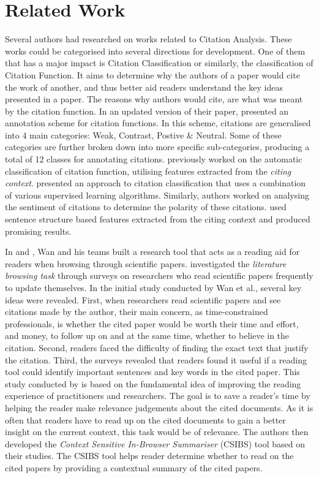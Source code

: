 \chapter{Related Work}
\label{Related Works}

Several authors had researched on works related to Citation Analysis. These works could be categorised into several directions for development. One of them that has a major impact is Citation Classification or similarly, the classification of Citation Function. It aims to determine why the authors of a paper would cite the work of another, and thus better aid readers understand the key ideas presented in a paper. The reasons why authors would cite, are what was meant by the citation function. In an updated version of their paper,  presented an annotation scheme for citation functions. In this scheme, citations are generalised into 4 main categories: Weak, Contrast, Postive \& Neutral. Some of these categories are further broken down into more specific sub-categories, producing a total of 12 classes for annotating citations.  previously worked on the automatic classification of citation function, utilising features extracted from the \textit{citing context}.  presented an approach to citation classification that uses a combination of various supervised learning algorithms. Similarly, authors worked on analysing the sentiment of citations to determine the polarity of these citations.  used sentence structure based features extracted from the citing context and produced promising results.

In \cite{citation-sensitive} and \cite{csibs}, Wan and his teams built a research tool that acts as a reading aid for readers when browsing through scientific papers.  investigated the \textit{literature browsing task} through surveys on researchers who read scientific papers frequently to update themselves. In the initial study conducted by Wan et al., several key ideas were revealed. First, when researchers read scientific papers and see citations made by the author, their main concern, as time-constrained professionals, is whether the cited paper would be worth their time and effort, and money, to follow up on and at the same time, whether to believe in the citation. Second, readers faced the difficulty of finding the exact text that justify the citation. Third, the surveys revealed that readers found it useful if a reading tool could identify important sentences and key words in the cited paper. This study conducted by  is based on the fundamental idea of improving the reading experience of practitioners and researchers. The goal is to save a reader's time by helping the reader make relevance judgements about the cited documents. As it is often that readers have to read up on the cited documents to gain a better insight on the current context, this task would be of relevance. The authors then developed the {\it Context Sensitive In-Browser Summariser} (CSIBS) tool based on their studies. The CSIBS tool helps reader determine whether to read on the cited papers by providing a contextual summary of the cited papers.

